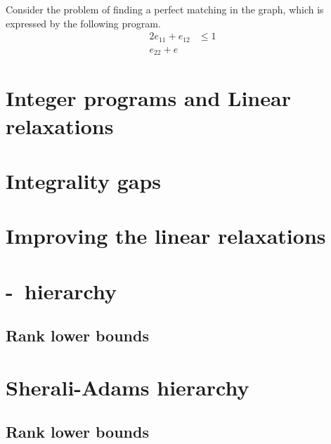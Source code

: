 \documentclass[a4paper,twoside,justified]{tufte-handout}
\begin{document}
\begin{marginfigure}
\begin{example}
  Consider the problem of finding a perfect matching in the graph,
  which is expressed by the following program.
  \begin{alignat*}{2}
    e_{11} + e_{12} & \leq 1\\
    e_{22} + e_{}
  \end{alignat*}
\end{example}
\end{marginfigure}

\section{Integer programs and Linear relaxations}


\section{Integrality gaps}


\section{Improving the linear relaxations}


\section{\Lovasz-\Schrijver\ hierarchy}

\subsection{Rank lower bounds}

\section{Sherali-Adams hierarchy}

\subsection{Rank lower bounds}




\end{document}
